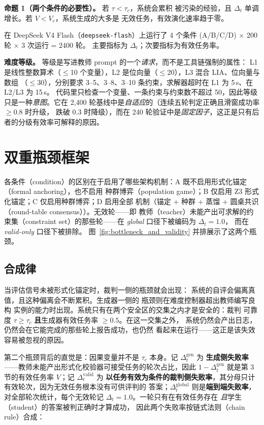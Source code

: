 \documentclass{article}
\begin{document}
\textbf{命题 1（两个条件的必要性）。} 若 $\tau < \tau_c$，系统会累积
被污染的经验，且 $\Delta_t$ 单调增长。若 $V < V_c$，系统生成的大多是
无效任务，有效演化速率趋于零。

在 DeepSeek V4 Flash（\texttt{deepseek-flash}）上运行了 4 个条件 (A/B/C/D) $\times$ 200 轮 $\times$ 3 次运行 = 2400 轮。
主要指标为 $\Delta_t$；次要指标为有效任务率。

\textbf{难度等级。} 等级是写进教师 prompt 的一个\emph{请求}，而不是工具链强制的属性：
L1 是线性整数算术（$\le$10 个变量），L2 是位向量（$\le$20），L3 混合 LIA、位向量与数组
（$\le$30），分别要求 3--5、3--8、3--10 条约束，求解器超时在 L1 为 5\,s、在 L2/L3 为 15\,s。
代码里只检查一个变量、一条约束与约束数不超过 50，因此等级只是一种\emph{意图}。它在
2{,}400 轮基线中是\emph{自适应}的（连续五轮判定正确且滑窗成功率 $\ge 0.8$ 时升级，
跌破 $0.3$ 时降级），而在 240 轮验证中是\emph{固定因子}，这正是只有后者的分级有效率可解释的原因。

\section{双重瓶颈框架}

各条件（condition）的区别在于启用了哪些架构机制：A 既不启用形式化锚定（formal anchoring），也不启用
种群博弈（population game）；B 仅启用 Z3 形式化锚定；C 仅启用种群博弈；D 启用全部
机制（锚定 + 种群 + 蒸馏 + 圆桌共识（round-table consensus））。无效轮——即
教师（teacher）未能产出可求解的约束集（constraint set）的那些轮——在 \textit{global} 口径下被编码为 $\Delta_t = 1.0$，
而在 \textit{valid-only} 口径下被排除。
图~\ref{fig:bottleneck_and_validity} 并排展示了这两个瓶颈。

\subsection{合成律}

当评估信号未被形式化锚定时，裁判一侧的瓶颈就会出现：
系统的自评会偏离真值，且这种偏离会不断累积。生成器一侧的
瓶颈则在难度控制器超出教师编写良构
实例的能力时出现。系统只有在两个安全区的交集之内才是安全的：裁判
可靠度 $\tau \ge \tau_c$ \textbf{且}生成器有效任务率 $\ge 0.5$。在这一交集之外，
系统仍然会产出日志，仍然会在它能完成的那些轮上报告成功，也仍然
看起来在运行——这正是该失效容易被忽视的原因。

第二个瓶颈背后的直觉是：因果变量并不是 $\tau_c$ 本身。记 $\Delta_t^{\mathrm{gen}}$ 为
\textbf{生成侧失败率}——教师未能产出形式化校验器可接受任务的轮次占比，因此
$1 - \Delta_t^{\mathrm{gen}}$ 就是第 3 节的有效任务率 $V$；记 $\Delta_t^{\mathrm{valid}}$ 为
\textbf{以任务有效为条件的裁判侧失败率}，其分母只计有效轮次，因为无效任务根本没有可供评判的
答案；$\Delta_t^{\mathrm{global}}$ 则是\textbf{端到端失败率}，对全部轮次统计，每个无效轮记
$\Delta_t = 1.0$。一轮只有在有效任务存在 \textit{且}学生（student）的答案被判正确时才算成功，
因此两个失败率按链式法则（chain rule）合成：
\end{document}
